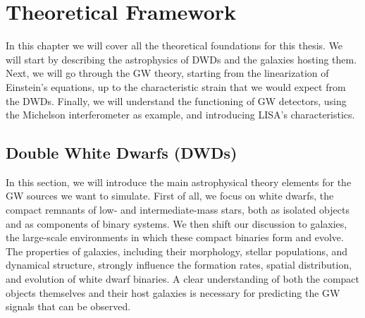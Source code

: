 \chapter{Theoretical Framework}
In this chapter we will cover all the theoretical foundations for this thesis. 
We will start by describing the astrophysics of DWDs and the galaxies hosting them.
Next, we will go through the GW theory, starting from the linearization of Einstein's equations, up to the characteristic strain that we would expect from the DWDs.
Finally, we will understand the functioning of GW detectors, using the Michelson interferometer as example, and introducing LISA's characteristics.


\section{Double White Dwarfs {(DWDs)}}
In this section, we will introduce the main astrophysical theory elements for the GW sources we want to simulate.
First of all, we focus on white dwarfs, the compact remnants of low- and intermediate-mass stars, both as isolated objects and as components of binary systems.  
We then shift our discussion to galaxies, the large-scale environments in which these compact binaries form and evolve. 
The properties of galaxies, including their morphology, stellar populations, and dynamical structure, strongly influence the formation rates, spatial distribution, and evolution of white dwarf binaries. 
A clear understanding of both the compact objects themselves and their host galaxies is necessary for predicting the GW signals that can be observed.

